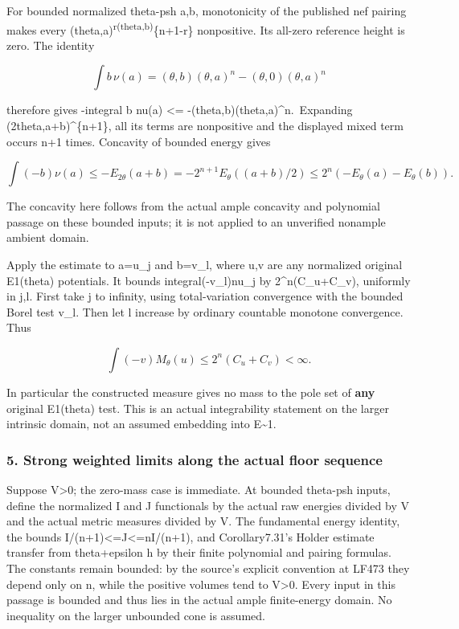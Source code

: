 \documentclass[
]{article}
\begin{document}
For bounded normalized theta-psh a,b, monotonicity of the published nef
pairing makes every (theta,a)\textsuperscript{r(theta,b)}\{n+1-r\}
nonpositive. Its all-zero reference height is zero. The identity

\[\int b\,\nu(a)=(\theta,b)(\theta,a)^n-(\theta,0)(\theta,a)^n\]

therefore gives -integral b nu(a) \textless=
-(theta,b)(theta,a)\^{}n.~Expanding (2theta,a+b)\^{}\{n+1\}, all its
terms are nonpositive and the displayed mixed term occurs n+1 times.
Concavity of bounded energy gives

\[\int(-b)\nu(a)\leq-E_{2\theta}(a+b)
=-2^{n+1}E_\theta((a+b)/2)
\leq2^n(-E_\theta(a)-E_\theta(b)).\]

The concavity here follows from the actual ample concavity and
polynomial passage on these bounded inputs; it is not applied to an
unverified nonample ambient domain.

Apply the estimate to a=u\_j and b=v\_l, where u,v are any normalized
original E1(theta) potentials. It bounds integral(-v\_l)nu\_j by
2\^{}n(C\_u+C\_v), uniformly in j,l. First take j to infinity, using
total-variation convergence with the bounded Borel test v\_l. Then let l
increase by ordinary countable monotone convergence. Thus

\[\int(-v)M_\theta(u)\leq2^n(C_u+C_v)<\infty.\]

In particular the constructed measure gives no mass to the pole set of
\textbf{any} original E1(theta) test. This is an actual integrability
statement on the larger intrinsic domain, not an assumed embedding into
E\textasciitilde1.

\subsubsection{5. Strong weighted limits along the actual floor
sequence}\label{strong-weighted-limits-along-the-actual-floor-sequence}

Suppose V\textgreater0; the zero-mass case is immediate. At bounded
theta-psh inputs, define the normalized I and J functionals by the
actual raw energies divided by V and the actual metric measures divided
by V. The fundamental energy identity, the bounds
I/(n+1)\textless=J\textless=nI/(n+1), and Corollary7.31's Holder
estimate transfer from theta+epsilon h by their finite polynomial and
pairing formulas. The constants remain bounded: by the source's explicit
convention at LF473 they depend only on n, while the positive volumes
tend to V\textgreater0. Every input in this passage is bounded and thus
lies in the actual ample finite-energy domain. No inequality on the
larger unbounded cone is assumed.
\end{document}

